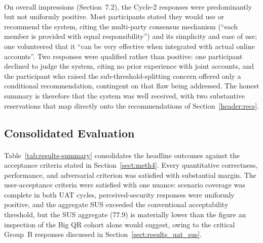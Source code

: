 \paragraph{}On overall impressions (Section~7.2), the Cycle-2 responses were predominantly but not uniformly positive. Most participants stated they would use or recommend the system, citing the multi-party consensus mechanism (``each member is provided with equal responsibility'') and its simplicity and ease of use; one volunteered that it ``can be very effective when integrated with actual online accounts''. Two responses were qualified rather than positive: one participant declined to judge the system, citing no prior experience with joint accounts, and the participant who raised the sub-threshold-splitting concern offered only a conditional recommendation, contingent on that flaw being addressed. The honest summary is therefore that the system was well received, with two substantive reservations that map directly onto the recommendations of Section~\ref{header:recs}.

\subsection{Consolidated Evaluation}
\label{sect:results_summary}

\paragraph{}Table~\ref{tab:results-summary} consolidates the headline outcomes against the acceptance criteria stated in Section~\ref{sect:meth4}. Every quantitative correctness, performance, and adversarial criterion was satisfied with substantial margin. The user-acceptance criteria were satisfied with one nuance: scenario coverage was complete in both UAT cycles, perceived-security responses were uniformly positive, and the aggregate SUS exceeded the conventional acceptability threshold, but the SUS aggregate ($77.9$) is materially lower than the figure an inspection of the Big QR cohort alone would suggest, owing to the critical Group~B responses discussed in Section~\ref{sect:results_uat_sus}.

